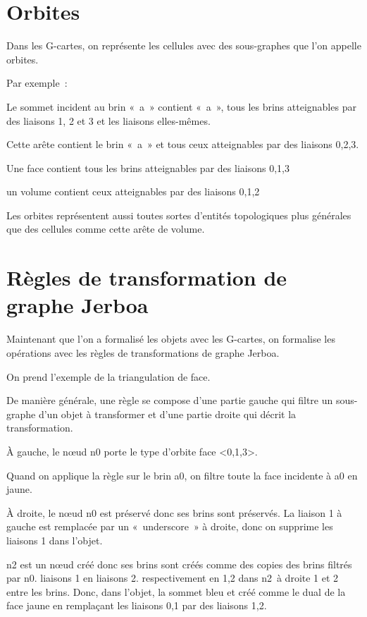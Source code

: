 \documentclass[11pt]{article}
\begin{document}
\section{Orbites}
\label{sec:org99b57a4}

Dans les G-cartes, on représente les cellules avec des sous-graphes que l'on
appelle orbites.

Par exemple~:

Le sommet incident au brin «~a~» contient «~a~», tous les brins atteignables par
des liaisons 1, 2 et 3 et les liaisons elles-mêmes.

Cette arête contient le brin «~a~» et tous ceux atteignables par des liaisons
0,2,3.

Une face contient tous les brins atteignables par des liaisons 0,1,3

un volume contient ceux atteignables par des liaisons 0,1,2

Les orbites représentent aussi toutes sortes d'entités topologiques plus
générales que des cellules comme cette arête de volume.


\section{Règles de transformation de graphe Jerboa}
\label{sec:org89fe9a5}

Maintenant que l'on a formalisé les objets avec les G-cartes, on formalise les
opérations avec les règles de transformations de graphe Jerboa.

On prend l'exemple de la triangulation de face.

De manière générale, une règle se compose d'une partie gauche qui filtre un
sous-graphe d'un objet à transformer et d'une partie droite qui décrit la
transformation.

À gauche, le nœud n0 porte le type d'orbite face <0,1,3>.

Quand on applique la règle sur le brin a0, on filtre toute la face incidente à
a0 en jaune.

À droite, le nœud n0 est préservé donc ses brins sont préservés. La liaison 1 à
gauche est remplacée par un «~underscore~» à droite, donc on supprime les
liaisons 1 dans l'objet.

n2 est un nœud créé donc ses brins sont créés comme des copies des brins filtrés
par n0. %
liaisons 1 en liaisons 2. %
respectivement en 1,2 dans n2 à droite %
1 et 2 entre les brins. Donc, dans l'objet, la sommet bleu et créé comme le dual
de la face jaune en remplaçant les liaisons 0,1 par des liaisons 1,2.
\end{document}
